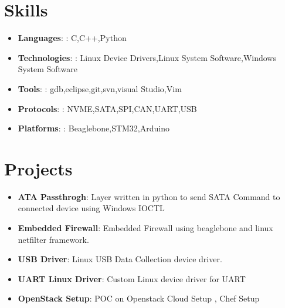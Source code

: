\documentclass[letterpaper,11pt]{article}
\newcommand{\resumeItem}[2]{
  \item\small{
    \textbf{#1}{: #2 \vspace{-2pt}}
  }
}
\newcommand{\resumeSubItem}[2]{\resumeItem{#1}{#2}\vspace{-4pt}}
\newcommand{\resumeSubHeadingListStart}{\begin{itemize}[leftmargin=*]}
\newcommand{\resumeSubHeadingListEnd}{\end{itemize}}
\begin{document}
\section{Skills}
\vspace*{5px} 
      \resumeSubHeadingListStart
        \resumeSubItem{Languages}{: C,C++,Python}
        \resumeSubItem{Technologies}{: Linux Device Drivers,Linux System Software,Windows System Software}
        \resumeSubItem{Tools}{: gdb,eclipse,git,svn,visual Studio,Vim}
        \resumeSubItem{Protocols}{: NVME,SATA,SPI,CAN,UART,USB}
        \resumeSubItem{Platforms}{: Beaglebone,STM32,Arduino}
      \resumeSubHeadingListEnd
\vspace*{10px} 
\section{Projects}
\vspace*{5px} 
  \resumeSubHeadingListStart
    \resumeSubItem{ATA Passthrogh}
      {Layer written in python to send SATA Command to connected device using Windows IOCTL }
    \resumeSubItem{Embedded Firewall}
      {Embedded Firewall using beaglebone and linux netfilter framework.}
    \resumeSubItem{USB Driver}
      {Linux USB Data Collection device driver.}
    \resumeSubItem{UART Linux Driver}
      {Custom Linux device driver for UART}
    \resumeSubItem{OpenStack Setup}
      {POC on Openstack Cloud Setup , Chef Setup}
  \resumeSubHeadingListEnd

%


\end{document}
